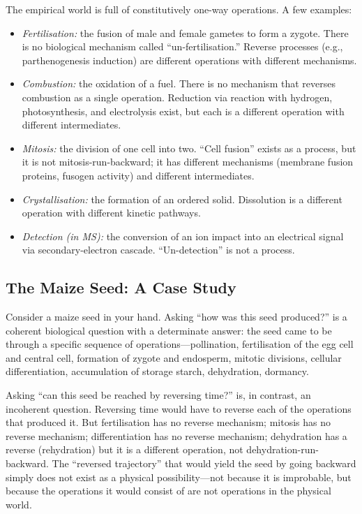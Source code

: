 \documentclass[twocolumn,10pt,a4paper]{article}
\theoremstyle{definition}
\theoremstyle{remark}
\begin{document}
The empirical world is full of constitutively one-way operations. A few examples:

\begin{itemize}[leftmargin=1.2em,itemsep=0.2em]
    \item \emph{Fertilisation:} the fusion of male and female gametes to form a zygote. There is no biological mechanism called ``un-fertilisation.'' Reverse processes (e.g., parthenogenesis induction) are different operations with different mechanisms.

    \item \emph{Combustion:} the oxidation of a fuel. There is no mechanism that reverses combustion as a single operation. Reduction via reaction with hydrogen, photosynthesis, and electrolysis exist, but each is a different operation with different intermediates.

    \item \emph{Mitosis:} the division of one cell into two. ``Cell fusion'' exists as a process, but it is not mitosis-run-backward; it has different mechanisms (membrane fusion proteins, fusogen activity) and different intermediates.

    \item \emph{Crystallisation:} the formation of an ordered solid. Dissolution is a different operation with different kinetic pathways.

    \item \emph{Detection (in MS):} the conversion of an ion impact into an electrical signal via secondary-electron cascade. ``Un-detection'' is not a process.
\end{itemize}

\subsection{The Maize Seed: A Case Study}

Consider a maize seed in your hand. Asking ``how was this seed produced?'' is a coherent biological question with a determinate answer: the seed came to be through a specific sequence of operations---pollination, fertilisation of the egg cell and central cell, formation of zygote and endosperm, mitotic divisions, cellular differentiation, accumulation of storage starch, dehydration, dormancy.

Asking ``can this seed be reached by reversing time?'' is, in contrast, an incoherent question. Reversing time would have to reverse each of the operations that produced it. But fertilisation has no reverse mechanism; mitosis has no reverse mechanism; differentiation has no reverse mechanism; dehydration has a reverse (rehydration) but it is a different operation, not dehydration-run-backward. The ``reversed trajectory'' that would yield the seed by going backward simply does not exist as a physical possibility---not because it is improbable, but because the operations it would consist of are not operations in the physical world.
\end{document}
